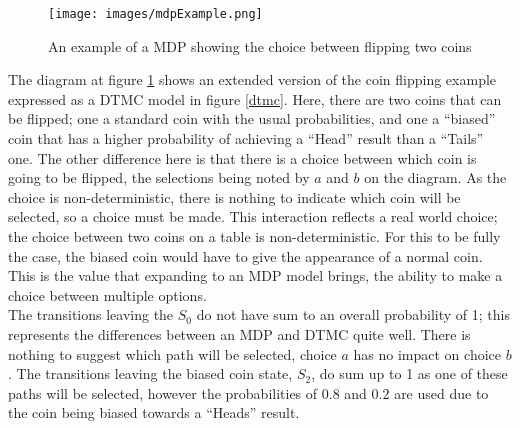 \documentclass{l4proj}
\begin{document}
\begin{figure}[h!]
\centering
\texttt{[image: images/mdpExample.png]}
\caption{An example of a MDP showing the choice between flipping two coins}
\label{mdp}
\end{figure}

The diagram at figure \ref{mdp} shows an extended version of the coin flipping example expressed as a DTMC model in figure \ref{dtmc}. Here, there are two coins that can be flipped; one a standard coin with the usual probabilities, and one a ``biased'' coin that has a higher probability of achieving a ``Head'' result than a ``Tails'' one. The other difference here is that there is a choice between which coin is going to be flipped, the selections being noted by $a$ and $b$ on the diagram. As the choice is non-deterministic, there is nothing to indicate which coin will be selected, so a choice must be made. This interaction reflects a real world choice; the choice between two coins on a table is non-deterministic. For this to be fully the case, the biased coin would have to give the appearance of a normal coin. This is the value that expanding to an MDP model brings, the ability to make a choice between multiple options.\\ 
The transitions leaving the $S_0$ do not have sum to an overall probability of 1; this represents the differences between an MDP and DTMC quite well. There is nothing to suggest which path will be selected, choice $a$ has no impact on choice $b$. The transitions leaving the biased coin state, $S_2$, do sum up to 1 as one of these paths will be selected, however the probabilities of $0.8$ and $0.2$ are used due to the coin being biased towards a ``Heads'' result.




\end{document}
